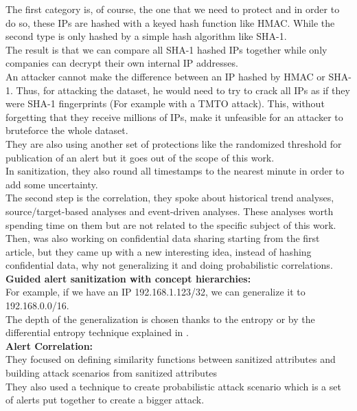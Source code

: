 \documentclass{eplmastersthesis}
\begin{document}
The first category is, of course, the one that we need to protect and in order to do so, these IPs are hashed with a keyed hash function like HMAC. While the second type is only hashed by a simple hash algorithm like SHA-1.\\
The result is that we can compare all SHA-1 hashed IPs together while only companies can decrypt their own internal IP addresses.\\
An attacker cannot make the difference between an IP hashed by HMAC  or SHA-1. Thus, for attacking the dataset, he would need to try to crack all IPs as if they were SHA-1 fingerprints (For example with a TMTO attack). This, without forgetting that they receive millions of IPs, make it unfeasible for an attacker to bruteforce the whole dataset.\\
They are also using another set of protections like the randomized threshold for publication of an alert but it goes out of the scope of this work.\\ 
In sanitization, they also round all timestamps to the nearest minute in order to add some uncertainty.\\
The second step is the correlation, they spoke about historical trend analyses, source/target-based analyses and event-driven analyses. These analyses worth spending time on them but are not related to the specific subject of this work.\\

Then, \cite{xu2005privacy} was also working on confidential data sharing starting from the first article, but they came up with a new interesting idea, instead of hashing confidential data, why not generalizing it and doing probabilistic correlations.\\
\textbf{Guided alert sanitization with concept hierarchies:}\\
For example, if we have an IP 192.168.1.123/32, we can generalize it to 192.168.0.0/16.\\
The depth of the generalization is chosen thanks to the entropy or by the differential entropy technique explained in \cite{cover1991elements}.
\\
\textbf{Alert Correlation:}\\
They focused on defining similarity functions between sanitized attributes and building attack scenarios from sanitized attributes\\
They also used a technique to create probabilistic attack scenario which is a set of alerts put together to create a bigger attack.\\
\end{document}
